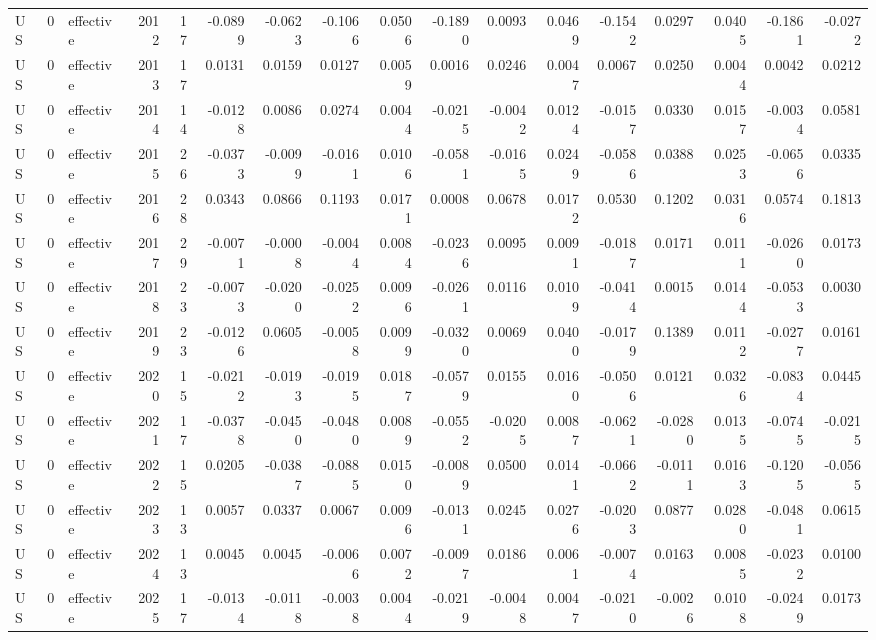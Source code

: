 \begin{tabular}{lrlrrrrrrrrrrrrrr}
US & 0 & effective & 2012 & 17 & -0.0899 & -0.0623 & -0.1066 & 0.0506 & -0.1890 & 0.0093 & 0.0469 & -0.1542 & 0.0297 & 0.0405 & -0.1861 & -0.0272 \\
US & 0 & effective & 2013 & 17 & 0.0131 & 0.0159 & 0.0127 & 0.0059 & 0.0016 & 0.0246 & 0.0047 & 0.0067 & 0.0250 & 0.0044 & 0.0042 & 0.0212 \\
US & 0 & effective & 2014 & 14 & -0.0128 & 0.0086 & 0.0274 & 0.0044 & -0.0215 & -0.0042 & 0.0124 & -0.0157 & 0.0330 & 0.0157 & -0.0034 & 0.0581 \\
US & 0 & effective & 2015 & 26 & -0.0373 & -0.0099 & -0.0161 & 0.0106 & -0.0581 & -0.0165 & 0.0249 & -0.0586 & 0.0388 & 0.0253 & -0.0656 & 0.0335 \\
US & 0 & effective & 2016 & 28 & 0.0343 & 0.0866 & 0.1193 & 0.0171 & 0.0008 & 0.0678 & 0.0172 & 0.0530 & 0.1202 & 0.0316 & 0.0574 & 0.1813 \\
US & 0 & effective & 2017 & 29 & -0.0071 & -0.0008 & -0.0044 & 0.0084 & -0.0236 & 0.0095 & 0.0091 & -0.0187 & 0.0171 & 0.0111 & -0.0260 & 0.0173 \\
US & 0 & effective & 2018 & 23 & -0.0073 & -0.0200 & -0.0252 & 0.0096 & -0.0261 & 0.0116 & 0.0109 & -0.0414 & 0.0015 & 0.0144 & -0.0533 & 0.0030 \\
US & 0 & effective & 2019 & 23 & -0.0126 & 0.0605 & -0.0058 & 0.0099 & -0.0320 & 0.0069 & 0.0400 & -0.0179 & 0.1389 & 0.0112 & -0.0277 & 0.0161 \\
US & 0 & effective & 2020 & 15 & -0.0212 & -0.0193 & -0.0195 & 0.0187 & -0.0579 & 0.0155 & 0.0160 & -0.0506 & 0.0121 & 0.0326 & -0.0834 & 0.0445 \\
US & 0 & effective & 2021 & 17 & -0.0378 & -0.0450 & -0.0480 & 0.0089 & -0.0552 & -0.0205 & 0.0087 & -0.0621 & -0.0280 & 0.0135 & -0.0745 & -0.0215 \\
US & 0 & effective & 2022 & 15 & 0.0205 & -0.0387 & -0.0885 & 0.0150 & -0.0089 & 0.0500 & 0.0141 & -0.0662 & -0.0111 & 0.0163 & -0.1205 & -0.0565 \\
US & 0 & effective & 2023 & 13 & 0.0057 & 0.0337 & 0.0067 & 0.0096 & -0.0131 & 0.0245 & 0.0276 & -0.0203 & 0.0877 & 0.0280 & -0.0481 & 0.0615 \\
US & 0 & effective & 2024 & 13 & 0.0045 & 0.0045 & -0.0066 & 0.0072 & -0.0097 & 0.0186 & 0.0061 & -0.0074 & 0.0163 & 0.0085 & -0.0232 & 0.0100 \\
US & 0 & effective & 2025 & 17 & -0.0134 & -0.0118 & -0.0038 & 0.0044 & -0.0219 & -0.0048 & 0.0047 & -0.0210 & -0.0026 & 0.0108 & -0.0249 & 0.0173 \\

\end{tabular}
